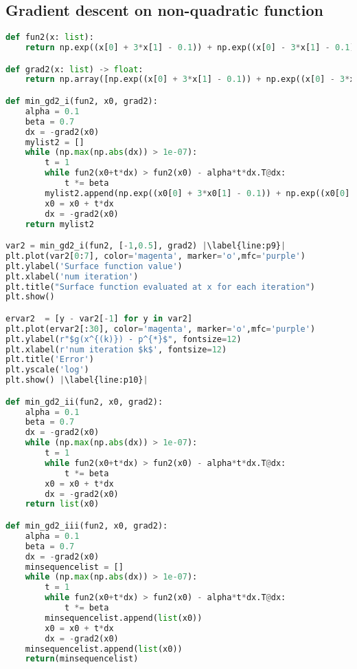 \subsection{Gradient descent on non-quadratic function}\label{GD-on-nqd}
\begin{lstlisting}[language=Python, label={lst:code4}, mathescape=true, breaklines=true, escapechar=|]
def fun2(x: list):
    return np.exp((x[0] + 3*x[1] - 0.1)) + np.exp((x[0] - 3*x[1] - 0.1)) + np.exp((-x[0] - 0.1))

def grad2(x: list) -> float:
    return np.array([np.exp((x[0] + 3*x[1] - 0.1)) + np.exp((x[0] - 3*x[1] - 0.1)) - np.exp((-x[0] - 0.1)), 3*np.exp((x[0] + 3*x[1] - 0.1)) - 3*np.exp((x[0] - 3*x[1] - 0.1))])

def min_gd2_i(fun2, x0, grad2):
    alpha = 0.1
    beta = 0.7
    dx = -grad2(x0)
    mylist2 = []
    while (np.max(np.abs(dx)) > 1e-07):
        t = 1
        while fun2(x0+t*dx) > fun2(x0) - alpha*t*dx.T@dx:
            t *= beta
        mylist2.append(np.exp((x0[0] + 3*x0[1] - 0.1)) + np.exp((x0[0] - 3*x0[1] - 0.1)) + np.exp((-x0[0] - 0.1)))
        x0 = x0 + t*dx
        dx = -grad2(x0)
    return mylist2

var2 = min_gd2_i(fun2, [-1,0.5], grad2) |\label{line:p9}|
plt.plot(var2[0:7], color='magenta', marker='o',mfc='purple')
plt.ylabel('Surface function value') 
plt.xlabel('num iteration') 
plt.title("Surface function evaluated at x for each iteration") 
plt.show() 

ervar2  = [y - var2[-1] for y in var2]
plt.plot(ervar2[:30], color='magenta', marker='o',mfc='purple')
plt.ylabel(r"$g(x^{(k)}) - p^{*}$", fontsize=12) 
plt.xlabel(r'num iteration $k$', fontsize=12) 
plt.title('Error')
plt.yscale('log')
plt.show() |\label{line:p10}|

def min_gd2_ii(fun2, x0, grad2):
    alpha = 0.1
    beta = 0.7
    dx = -grad2(x0)
    while (np.max(np.abs(dx)) > 1e-07):
        t = 1
        while fun2(x0+t*dx) > fun2(x0) - alpha*t*dx.T@dx:
            t *= beta
        x0 = x0 + t*dx
        dx = -grad2(x0)
    return list(x0)

def min_gd2_iii(fun2, x0, grad2):
    alpha = 0.1
    beta = 0.7
    dx = -grad2(x0)
    minsequencelist = []
    while (np.max(np.abs(dx)) > 1e-07):
        t = 1
        while fun2(x0+t*dx) > fun2(x0) - alpha*t*dx.T@dx:
            t *= beta
        minsequencelist.append(list(x0))
        x0 = x0 + t*dx
        dx = -grad2(x0)
    minsequencelist.append(list(x0))
    return(minsequencelist)


\end{lstlisting}
